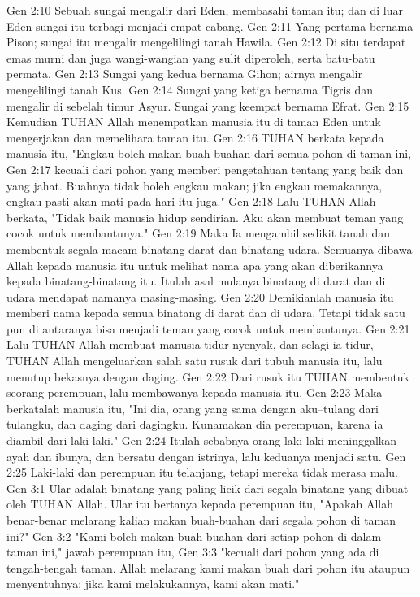 Gen 2:10  Sebuah sungai mengalir dari Eden, membasahi taman itu; dan di luar Eden sungai itu terbagi menjadi empat cabang.
Gen 2:11  Yang pertama bernama Pison; sungai itu mengalir mengelilingi tanah Hawila.
Gen 2:12  Di situ terdapat emas murni dan juga wangi-wangian yang sulit diperoleh, serta batu-batu permata.
Gen 2:13  Sungai yang kedua bernama Gihon; airnya mengalir mengelilingi tanah Kus.
Gen 2:14  Sungai yang ketiga bernama Tigris dan mengalir di sebelah timur Asyur. Sungai yang keempat bernama Efrat.
Gen 2:15  Kemudian TUHAN Allah menempatkan manusia itu di taman Eden untuk mengerjakan dan memelihara taman itu.
Gen 2:16  TUHAN berkata kepada manusia itu, "Engkau boleh makan buah-buahan dari semua pohon di taman ini,
Gen 2:17  kecuali dari pohon yang memberi pengetahuan tentang yang baik dan yang jahat. Buahnya tidak boleh engkau makan; jika engkau memakannya, engkau pasti akan mati pada hari itu juga."
Gen 2:18  Lalu TUHAN Allah berkata, "Tidak baik manusia hidup sendirian. Aku akan membuat teman yang cocok untuk membantunya."
Gen 2:19  Maka Ia mengambil sedikit tanah dan membentuk segala macam binatang darat dan binatang udara. Semuanya dibawa Allah kepada manusia itu untuk melihat nama apa yang akan diberikannya kepada binatang-binatang itu. Itulah asal mulanya binatang di darat dan di udara mendapat namanya masing-masing.
Gen 2:20  Demikianlah manusia itu memberi nama kepada semua binatang di darat dan di udara. Tetapi tidak satu pun di antaranya bisa menjadi teman yang cocok untuk membantunya.
Gen 2:21  Lalu TUHAN Allah membuat manusia tidur nyenyak, dan selagi ia tidur, TUHAN Allah mengeluarkan salah satu rusuk dari tubuh manusia itu, lalu menutup bekasnya dengan daging.
Gen 2:22  Dari rusuk itu TUHAN membentuk seorang perempuan, lalu membawanya kepada manusia itu.
Gen 2:23  Maka berkatalah manusia itu, "Ini dia, orang yang sama dengan aku--tulang dari tulangku, dan daging dari dagingku. Kunamakan dia perempuan, karena ia diambil dari laki-laki."
Gen 2:24  Itulah sebabnya orang laki-laki meninggalkan ayah dan ibunya, dan bersatu dengan istrinya, lalu keduanya menjadi satu.
Gen 2:25  Laki-laki dan perempuan itu telanjang, tetapi mereka tidak merasa malu.
Gen 3:1  Ular adalah binatang yang paling licik dari segala binatang yang dibuat oleh TUHAN Allah. Ular itu bertanya kepada perempuan itu, "Apakah Allah benar-benar melarang kalian makan buah-buahan dari segala pohon di taman ini?"
Gen 3:2  "Kami boleh makan buah-buahan dari setiap pohon di dalam taman ini," jawab perempuan itu,
Gen 3:3  "kecuali dari pohon yang ada di tengah-tengah taman. Allah melarang kami makan buah dari pohon itu ataupun menyentuhnya; jika kami melakukannya, kami akan mati."
